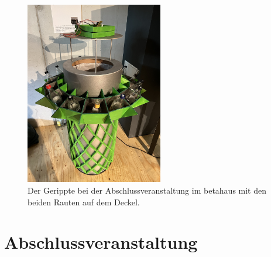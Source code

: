     \begin{figure}[H]
        \begin{center}
            \includegraphics[width=6cm]{media/04_result/pic_bin.jpg}
        \end{center}
        \caption{Der Gerippte bei der Abschlussveranstaltung im betahaus mit den beiden Rauten auf dem Deckel.}
        \label{fig:pic_gerippte_1}
    \end{figure}

\section{Abschlussveranstaltung}

